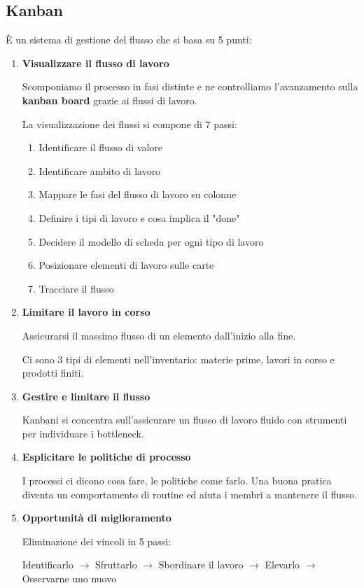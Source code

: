 \documentclass{report}
\begin{document}
\subsection*{Kanban}
\`E un sistema di gestione del flusso che si basa su 5 punti:
\begin{enumerate}
    \item \textbf{Visualizzare il flusso di lavoro}
    
    \noindent
    Scomponiamo il processo in fasi distinte e ne controlliamo l'avanzamento sulla \textbf{kanban board} grazie ai flussi di lavoro.

    \noindent
    La visualizzazione dei flussi si compone di 7 passi:
    \begin{enumerate}[label = \Roman*.]
        \item Identificare il flusso di valore
        \item Identificare ambito di lavoro
        \item Mappare le fasi del flusso di lavoro su colonne
        \item Definire i tipi di lavoro e cosa implica il "done"
        \item Decidere il modello di scheda per ogni tipo di lavoro
        \item Posizionare elementi di lavoro sulle carte
        \item Tracciare il flusso
    \end{enumerate}
    \item \textbf{Limitare il lavoro in corso}
    
    \noindent
    Assicurarsi il massimo flusso di un elemento dall'inizio alla fine.

    \noindent
    Ci sono 3 tipi di elementi nell'inventario: materie prime, lavori in corso e prodotti finiti.

    \item \textbf{Gestire e limitare il flusso}
    
    \noindent
    Kanbani  si concentra sull'assicurare un flusso di lavoro fluido con strumenti per individuare i bottleneck.

    \item \textbf{Esplicitare le politiche di processo}
    
    \noindent
    I processi ci dicono cosa fare, le politiche come farlo. Una buona pratica diventa un comportamento di routine ed aiuta i membri a mantenere il flusso.

    \item \textbf{Opportunità di miglioramento}
    
    \noindent
    Eliminazione dei vincoli in 5 passi:

    \noindent
    Identificarlo $\rightarrow$ Sfruttarlo $\rightarrow$ Sbordinare il lavoro $\rightarrow$ Elevarlo $\rightarrow$ Osservarne uno nuovo
\end{enumerate}
\end{document}

